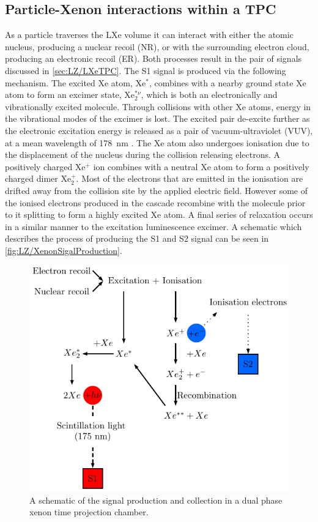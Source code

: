 \subsection{Particle-Xenon interactions within a TPC}\label{sec:LZ/XeInteractionsTPC}
As a particle traverses the LXe volume it can interact with either the atomic nucleus, producing a nuclear recoil (NR), or with the surrounding electron cloud, producing an electronic recoil (ER). Both processes result in the pair of signals discussed in \autoref{sec:LZ/LXeTPC}. The S1 signal is produced via the following mechanism. The excited Xe atom, Xe$^{*}$, combines with a nearby ground state Xe atom to form an excimer state, Xe$_{2}^{*\nu}$, which is both an electronically and vibrationally excited molecule. Through collisions with other Xe atoms, energy in the vibrational modes of the excimer is lost. The excited pair de-excite further as the electronic excitation energy is released as a pair of vacuum-ultraviolet (VUV), at a mean wavelength of 178~nm \cite{Schumann:2014uva}.
The Xe atom also undergoes ionisation due to the displacement of the nucleus during the collision releasing electrons. A positively charged Xe$^{+}$ ion combines with a neutral Xe atom to form a positively charged dimer Xe$^{+}_{2}$. Most of the electrons that are emitted in the ionisation are drifted away from the collision site by the applied electric field. However some of the ionised electrons produced in the cascade recombine with the molecule prior to it splitting to form a highly excited Xe atom. A final series of relaxation occurs in a similar manner to the excitation luminescence excimer. A schematic which describes the process of producing the S1 and S2 signal can be seen in \autoref{fig:LZ/XenonSigalProduction}.
\begin{figure}[!ht]
    \centering
    \includegraphics[width=0.7\linewidth]{figures/LZ/Xenon_interaction.pdf}
    \caption{A schematic of the signal production and collection in a dual phase xenon time projection chamber.}
    \label{fig:LZ/XenonSigalProduction}
\end{figure}
